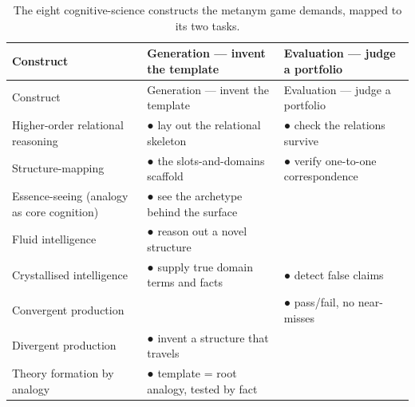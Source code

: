 \begin{longtable}[]{@{}
  >{\raggedright\arraybackslash}p{}
  >{\raggedright\arraybackslash}p{}
  >{\raggedright\arraybackslash}p{}@{}}
\caption{The eight cognitive-science constructs the metanym game demands, mapped to its two tasks.}\tabularnewline
\toprule\noalign{}
\begin{minipage}[b]{\linewidth}\raggedright
Construct
\end{minipage} & \begin{minipage}[b]{\linewidth}\raggedright
Generation --- invent the template
\end{minipage} & \begin{minipage}[b]{\linewidth}\raggedright
Evaluation --- judge a portfolio
\end{minipage} \\
\midrule\noalign{}
\endfirsthead
\toprule\noalign{}
\begin{minipage}[b]{\linewidth}\raggedright
Construct
\end{minipage} & \begin{minipage}[b]{\linewidth}\raggedright
Generation --- invent the template
\end{minipage} & \begin{minipage}[b]{\linewidth}\raggedright
Evaluation --- judge a portfolio
\end{minipage} \\
\midrule\noalign{}
\endhead
\bottomrule\noalign{}
\endlastfoot
Higher-order relational reasoning & ● lay out the relational skeleton & ● check the relations survive \\
Structure-mapping & ● the slots-and-domains scaffold & ● verify one-to-one correspondence \\
Essence-seeing (analogy as core cognition) & ● see the archetype behind the surface & \\
Fluid intelligence & ● reason out a novel structure & \\
Crystallised intelligence & ● supply true domain terms and facts & ● detect false claims \\
Convergent production & & ● pass/fail, no near-misses \\
Divergent production & ● invent a structure that travels & \\
Theory formation by analogy & ● template = root analogy, tested by fact & \\
\end{longtable}

